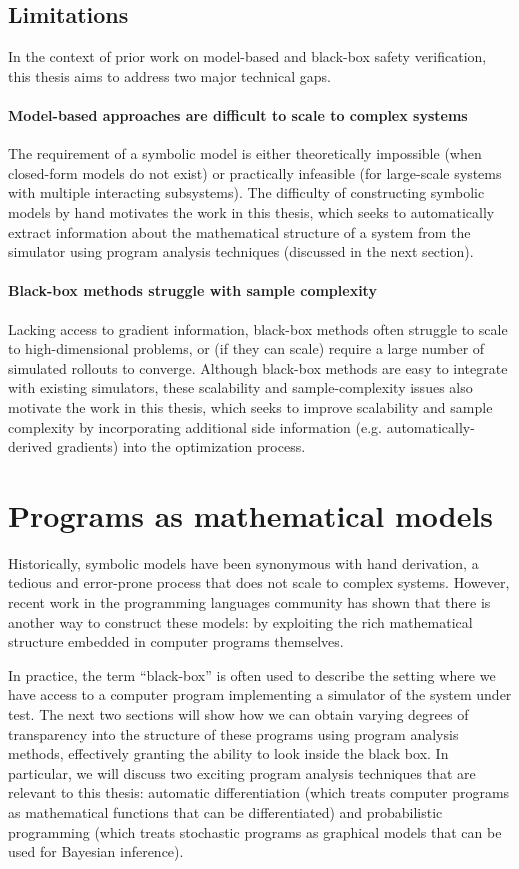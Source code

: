 \subsection{Limitations}

In the context of prior work on model-based and black-box safety verification, this thesis aims to address two major technical gaps.

\paragraph{Model-based approaches are difficult to scale to complex systems} The requirement of a symbolic model is either theoretically impossible (when closed-form models do not exist) or practically infeasible (for large-scale systems with multiple interacting subsystems). The difficulty of constructing symbolic models by hand motivates the work in this thesis, which seeks to automatically extract information about the mathematical structure of a system from the simulator using program analysis techniques (discussed in the next section).

\paragraph{Black-box methods struggle with sample complexity} Lacking access to gradient information, black-box methods often struggle to scale to high-dimensional problems, or (if they can scale) require a large number of simulated rollouts to converge. Although black-box methods are easy to integrate with existing simulators, these scalability and sample-complexity issues also motivate the work in this thesis, which seeks to improve scalability and sample complexity by incorporating additional side information (e.g. automatically-derived gradients) into the optimization process.

\section{Programs as mathematical models}

Historically, symbolic models have been synonymous with hand derivation, a tedious and error-prone process that does not scale to complex systems. However, recent work in the programming languages community has shown that there is another way to construct these models: by exploiting the rich mathematical structure embedded in computer programs themselves.

In practice, the term ``black-box'' is often used to describe the setting where we have access to a computer program implementing a simulator of the system under test. The next two sections will show how we can obtain varying degrees of transparency into the structure of these programs using program analysis methods, effectively granting the ability to look inside the black box. In particular, we will discuss two exciting program analysis techniques that are relevant to this thesis: automatic differentiation (which treats computer programs as mathematical functions that can be differentiated) and probabilistic programming (which treats stochastic programs as graphical models that can be used for Bayesian inference).

